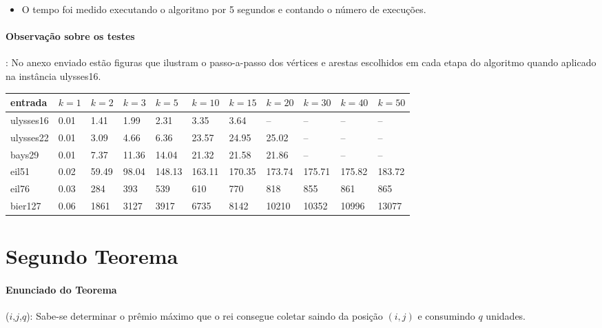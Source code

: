 \documentclass[paper=a4, fontsize=11pt]{scrartcl} %
\numberwithin{equation}{section} %
\numberwithin{figure}{section} %
\numberwithin{table}{section} %
\begin{document}
\begin{itemize}
   \item O tempo foi medido executando o algoritmo por 5 segundos e contando o número de execuções.
\end{itemize}

\paragraph{Observação sobre os testes}: No anexo enviado estão figuras que ilustram o passo-a-passo dos vértices e arestas escolhidos em cada etapa do algoritmo quando aplicado na instância ulysses16.

\begin{table}[H]
\centering
\begin{tabular}{l|l|l|l|l|l|l|l|l|l|l}
entrada & $k=1$ & $k=2$ & $k=3$ & $k=5$ & $k=10$ & $k=15$ & $k=20$ & $k=30$ & $k=40$ & $k=50$ \\\hline
ulysses16 & 0.01 & 1.41 & 1.99 & 2.31 & 3.35 & 3.64 & -- & -- & -- & -- \\
ulysses22 & 0.01 & 3.09 & 4.66 & 6.36 & 23.57 & 24.95 & 25.02 & -- & -- & -- \\
bays29 & 0.01 & 7.37 & 11.36 & 14.04 & 21.32 & 21.58 & 21.86 & -- & -- & -- \\
eil51 & 0.02 & 59.49 & 98.04 & 148.13 & 163.11 & 170.35 & 173.74 & 175.71 & 175.82 & 183.72 \\
eil76 & 0.03 & 284 & 393 & 539 & 610 & 770 & 818 & 855 & 861 & 865 \\
bier127 & 0.06 & 1861 & 3127 & 3917 & 6735 & 8142 & 10210 & 10352 & 10996 & 13077
\end{tabular}
\end{table}


\section{Segundo Teorema}

\paragraph{Enunciado do Teorema}($i$,$j$,$q$): Sabe-se determinar o prêmio máximo que o rei consegue coletar saindo da posição $(i,j)$ e consumindo $q$ unidades.
\end{document}
